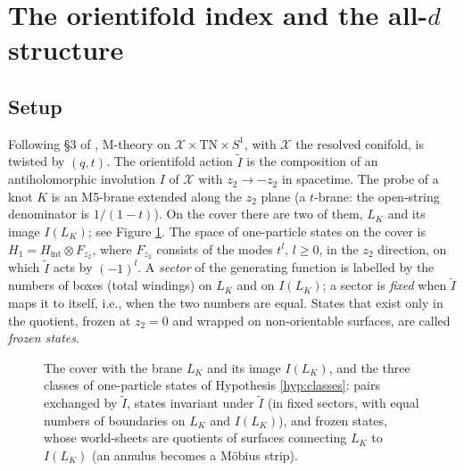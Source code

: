 \section{The orientifold index and the all-$d$ structure}\label{sec:index}

\subsection{Setup}\label{sec:index-setup}
Following \S3 of \cite{AgSc12}, M-theory on $\mathcal{X} \times \mathrm{TN} \times S^1$, with $\mathcal X$ the resolved conifold, is twisted by $(q, t)$. The orientifold action $\tilde I$ is the composition of an antiholomorphic involution $I$ of $\mathcal X$ with $z_2 \to -z_2$ in spacetime.
The probe of a knot $K$ is an M5-brane extended along the $z_2$ plane (a $t$-brane: the open-string denominator is $1/(1-t)$). On the cover there are two of them, $L_K$ and its image $I(L_K)$; see Figure \ref{fig:orientifold}.
The space of one-particle states on the cover is $H_1 = H_{\mathrm{int}} \otimes F_{z_2}$, where $F_{z_2}$ consists of the modes $t^l$, $l \ge 0$, in the $z_2$ direction, on which $\tilde I$ acts by $(-1)^l$. A \emph{sector} of the generating function is labelled by the numbers of boxes (total windings) on $L_K$ and on $I(L_K)$; a sector is \emph{fixed} when $\tilde I$ maps it to itself, i.e., when the two numbers are equal. States that exist only in the quotient, frozen at $z_2 = 0$ and wrapped on non-orientable surfaces, are called \emph{frozen states}.

\begin{figure}[htbp]
\centering
{}
\caption{The cover with the brane $L_K$ and its image $I(L_K)$, and the three classes of one-particle states of Hypothesis \ref{hyp:classes}: pairs exchanged by $\tilde I$, states invariant under $\tilde I$ (in fixed sectors, with equal numbers of boundaries on $L_K$ and $I(L_K)$), and frozen states, whose world-sheets are quotients of surfaces connecting $L_K$ to $I(L_K)$ (an annulus becomes a M\"obius strip).}\label{fig:orientifold}
\end{figure}

